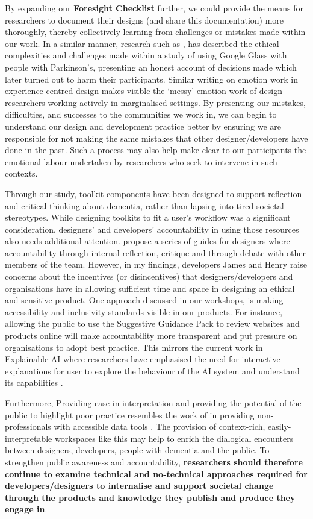 By expanding our \textbf{Foresight Checklist} further, we could provide the means for researchers to document their designs (and share this documentation) more thoroughly, thereby collectively learning from challenges or mistakes made within our work. In a similar manner, research such as \cite{vines_our_2017}, has described the ethical complexities and challenges made within a study of using Google Glass with people with Parkinson’s, presenting an honest account of decisions made which later turned out to harm their participants. Similar writing on emotion work in experience-centred design \citep{balaam_emotion_2019} makes visible the ‘messy’ emotion work of design researchers working actively in marginalised settings. By presenting our mistakes, difficulties, and successes to the communities we work in, we can begin to understand our design and development practice better by ensuring we are responsible for not making the same mistakes that other designer/developers have done in the past. Such a process may also help make clear to our participants the emotional labour undertaken by researchers who seek to intervene in such contexts.

Through our study, toolkit components have been designed to support reflection and critical thinking about dementia, rather than lapsing into tired societal stereotypes. While designing toolkits to fit a user’s workflow was a significant consideration, designers’ and developers’ accountability in using those resources also needs additional attention. \cite{frauenberger2015pursuit} propose a series of guides for designers where accountability through internal reflection, critique and through debate with other members of the team. However, in my findings, developers James and Henry raise concerns about the incentives (or disincentives) that designers/developers and organisations have in allowing sufficient time and space in designing an ethical and sensitive product. One approach discussed in our workshops, is making accessibility and inclusivity standards visible in our products. For instance, allowing the public to use the Suggestive Guidance Pack to review websites and products online will make accountability more transparent and put pressure on organisations to adopt best practice. This mirrors the current work in Explainable AI where researchers have emphasised the need for interactive explanations for user to explore the behaviour of the AI system and understand its capabilities \citep{abdul2018trends}. 

Furthermore, Providing ease in interpretation and providing the potential of the public to highlight poor practice resembles the work of \cite{puussaar2018making} in providing non-professionals with accessible data tools . The provision of context-rich, easily-interpretable workspaces like this may help to enrich the dialogical encounters between designers, developers, people with dementia and the public. To strengthen public awareness and accountability, \textbf{researchers should therefore continue to examine technical and no-technical approaches required for developers/designers to internalise and support societal change through the products and knowledge they publish and produce they engage in}.

